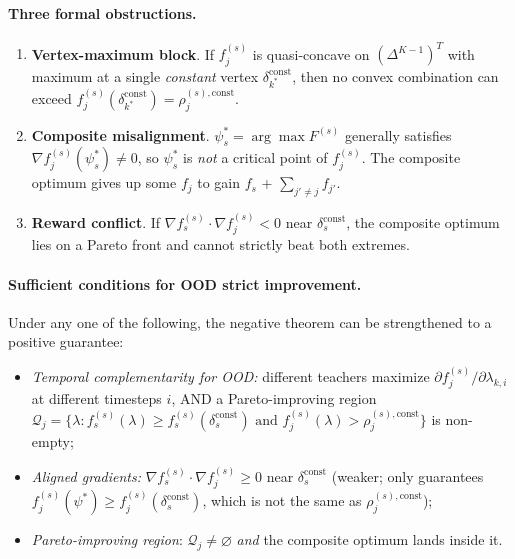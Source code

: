 \documentclass[11pt,a4paper]{article}
\newcommand{\const}{\mathrm{const}}
\theoremstyle{definition}
\begin{document}
\paragraph{Three formal obstructions.}

\begin{enumerate}[leftmargin=1.5em]
\item \textbf{Vertex-maximum block}. If $f_j^{(s)}$ is quasi-concave on
$(\Delta^{K-1})^T$ with maximum at a single \emph{constant} vertex
$\delta_{k^*}^{\const}$, then no convex combination can exceed
$f_j^{(s)}(\delta_{k^*}^{\const}) = \rho_j^{(s),\const}$.

\item \textbf{Composite misalignment}. $\psi^*_s = \arg\max F^{(s)}$
generally satisfies $\nabla f_j^{(s)}(\psi^*_s) \neq 0$, so $\psi^*_s$ is
\emph{not} a critical point of $f_j^{(s)}$. The composite optimum
gives up some $f_j$ to gain $f_s$ + $\sum_{j'\neq j}f_{j'}$.

\item \textbf{Reward conflict}. If $\nabla f_s^{(s)}\cdot \nabla
f_j^{(s)}<0$ near $\delta_s^{\const}$, the composite optimum lies on a
Pareto front and cannot strictly beat both extremes.
\end{enumerate}

\paragraph{Sufficient conditions for OOD strict improvement.}
Under any one of the following, the negative theorem can be strengthened
to a positive guarantee:

\begin{itemize}[leftmargin=1.5em]
\item[(A)] \emph{Temporal complementarity for OOD:} different teachers
maximize $\partial f_j^{(s)}/\partial \lambda_{k,i}$ at different
timesteps $i$, AND a Pareto-improving region
$\mathcal{Q}_j = \{\lambda: f_s^{(s)}(\lambda)\geq f_s^{(s)}(\delta_s^{\const})
\text{ and } f_j^{(s)}(\lambda) > \rho_j^{(s),\const}\}$ is non-empty;
\item[(B)] \emph{Aligned gradients:}
$\nabla f_s^{(s)}\cdot\nabla f_j^{(s)} \geq 0$ near $\delta_s^{\const}$
(weaker; only guarantees $f_j^{(s)}(\psi^*)\geq f_j^{(s)}(\delta_s^{\const})$,
which is not the same as $\rho_j^{(s),\const}$);
\item[(C)] \emph{Pareto-improving region}: $\mathcal{Q}_j\neq\varnothing$
\emph{and} the composite optimum lands inside it.
\end{itemize}
\end{document}
